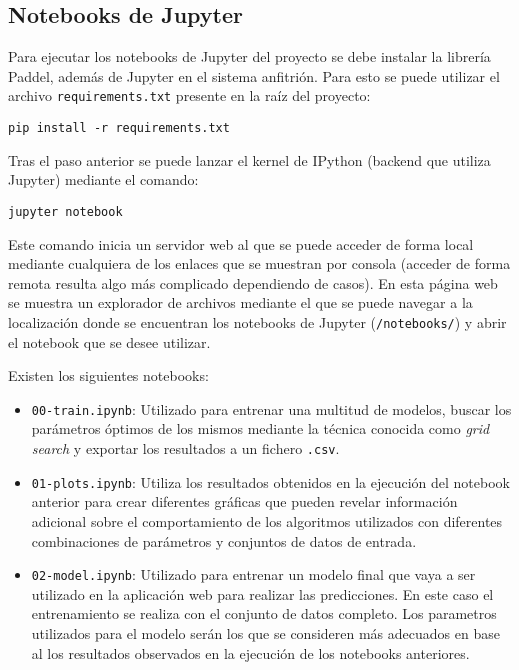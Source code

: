\subsection{Notebooks de Jupyter}

Para ejecutar los notebooks de Jupyter del proyecto se debe instalar la librería
Paddel, además de Jupyter en el sistema anfitrión. Para esto se puede utilizar
el archivo \texttt{requirements.txt} presente en la raíz del proyecto:

\texttt{pip install -r requirements.txt}

Tras el paso anterior se puede lanzar el kernel de IPython (backend que utiliza
Jupyter) mediante el comando:

\texttt{jupyter notebook}

Este comando inicia un servidor web al que se puede acceder de forma local
mediante cualquiera de los enlaces que se muestran por consola (acceder de forma
remota resulta algo más complicado dependiendo de casos). En esta página web se
muestra un explorador de archivos mediante el que se puede navegar a la
localización donde se encuentran los notebooks de Jupyter (\texttt{/notebooks/})
y abrir el notebook que se desee utilizar.

Existen los siguientes notebooks:

\begin{itemize}
    \item \texttt{00-train.ipynb}: Utilizado para entrenar una multitud de
    modelos, buscar los parámetros óptimos de los mismos mediante la técnica
    conocida como \textit{grid search} y exportar los resultados a un fichero
    \texttt{.csv}.
    \item \texttt{01-plots.ipynb}: Utiliza los resultados obtenidos en la
    ejecución del notebook anterior para crear diferentes gráficas que pueden
    revelar información adicional sobre el comportamiento de los algoritmos
    utilizados con diferentes combinaciones de parámetros y conjuntos de datos
    de entrada.
    \item \texttt{02-model.ipynb}: Utilizado para entrenar un modelo final que
    vaya a ser utilizado en la aplicación web para realizar las predicciones. En
    este caso el entrenamiento se realiza con el conjunto de datos completo. Los
    parametros utilizados para el modelo serán los que se consideren más
    adecuados en base al los resultados observados en la ejecución de los
    notebooks anteriores.
\end{itemize}

